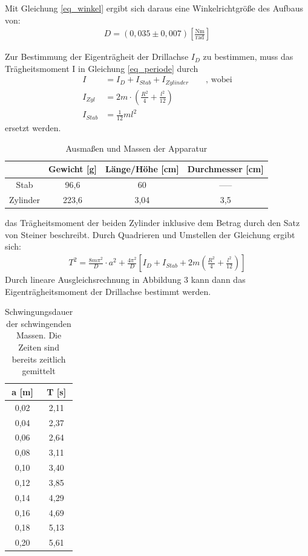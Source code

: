 Mit Gleichung \eqref{eq_winkel} ergibt sich daraus eine Winkelrichtgröße des Aufbaus von:
\begin{align*}
D=(0,035 \pm 0,007) \left[\frac{\text{Nm}}{\text{rad}}\right]
\end{align*}


Zur Bestimmung der Eigenträgheit der Drillachse $I_D$ zu bestimmen, muss das Trägheitsmoment I in Gleichung \eqref{eq_periode} durch
\begin{align*}
I&=I_D+I_{Stab}+I_{Zylinder} \qquad \text{, wobei}\\
I_{Zyl}&=2m\cdot\left(\frac{R^2}{4}+\frac{l^2}{12}\right)\\
I_{Stab}&= \frac{1}{12}ml^2
\end{align*}
ersetzt werden.
\begin{table}[H]
\begin{tabular}{|c|c|c|c|}
\hline 
 & Gewicht [g] & Länge/Höhe [cm] & Durchmesser [cm] \\ 
\hline 
Stab & 96,6 & 60 & ----- \\ 
\hline 
Zylinder & 223,6 & 3,04 & 3,5 \\ 
\hline 
\end{tabular}\newline
\caption{Ausmaßen und Massen der Apparatur}
\end{table}
das Trägheitsmoment der beiden Zylinder inklusive dem Betrag durch den Satz von Steiner beschreibt.
Durch Quadrieren und Umstellen der Gleichung ergibt sich:
\begin{align}
T^2=\frac{8m\pi^2}{D}\cdot a^2 + \frac{4\pi^2}{D}  \left[  I_D+I_{Stab}+2m\left(\frac{R^2}{4}+\frac{l^2}{12}\right)\right]
\end{align}
Durch lineare Ausgleichsrechnung in Abbildung 3 kann dann das Eigenträgheitsmoment der Drillachse bestimmt werden.

\begin{table}[H]
\begin{tabular}{|c|c|}
\hline
a [m] &	T [s]\\ \hline
0,02	&2,11\\ \hline
0,04&	2,37\\ \hline
0,06&	2,64\\ \hline
0,08&	3,11\\ \hline
0,10&	3,40\\ \hline
0,12&	3,85\\ \hline
0,14&	4,29\\ \hline
0,16&	4,69\\ \hline
0,18&	5,13\\ \hline
0,20&	5,61\\ \hline
\end{tabular} 
\caption{Schwingungsdauer der schwingenden Massen. Die Zeiten sind bereits zeitlich gemittelt}
\end{table}

